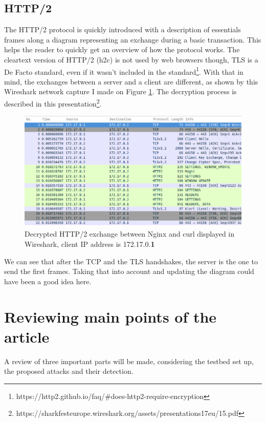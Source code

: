 \documentclass[11pt, a4paper]{article}
\begin{document}
\subsection{HTTP/2}

The HTTP/2 protocol is quickly introduced with a description of essentials frames along a diagram representing an exchange during a basic transaction.
This helps the reader to quickly get an overview of how the protocol works.
The cleartext version of HTTP/2 (h2c) is not used by web browsers though, TLS is a De Facto standard, even if it wasn't included in the standard\footnote{https://http2.github.io/faq/\#does-http2-require-encryption}.
With that in mind, the exchanges between a server and a client are different, as shown by this Wireshark network capture I made on Figure \ref{fig:wireshark}. The decryption process is described in this presentation\footnote{https://sharkfesteurope.wireshark.org/assets/presentations17eu/15.pdf}.
\begin{figure}[ht]
	\centering
	\includegraphics[scale=0.5]{images/HTTP2BasicExchangeNginxCurl.png}
	\caption{Decrypted HTTP/2 exchange between Nginx and curl displayed in Wireshark, client IP address is 172.17.0.\textbf{1}}
	\label{fig:wireshark}
\end{figure}
We can see that after the TCP and the TLS handshakes, the server is the one to send the first frames.
Taking that into account and updating the diagram could have been a good idea here.

\section{Reviewing main points of the article}

A review of three important parts will be made, considering the testbed set up, the proposed attacks and their detection.
\end{document}
